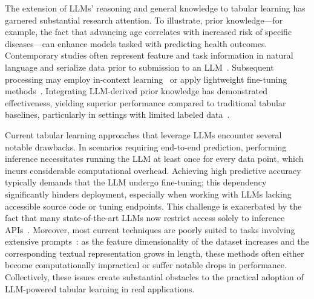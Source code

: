 The extension of LLMs’ reasoning and general knowledge to tabular learning has garnered substantial research attention. To illustrate, prior knowledge—for example, the fact that advancing age correlates with increased risk of specific diseases—can enhance models tasked with predicting health outcomes. Contemporary studies often represent feature and task information in natural language and serialize data prior to submission to an LLM~\cite{dinh2022lift,wang2023anypredict}. Subsequent processing may employ in-context learning~\cite{nam2023semi} or apply lightweight fine-tuning methods~\cite{dinh2022lift,hegselmann2023tabllm}. Integrating LLM-derived prior knowledge has demonstrated effectiveness, yielding superior performance compared to traditional tabular baselines, particularly in settings with limited labeled data~\cite{hegselmann2023tabllm}.

Current tabular learning approaches that leverage LLMs encounter several notable drawbacks. In scenarios requiring end-to-end prediction, performing inference necessitates running the LLM at least once for every data point, which incurs considerable computational overhead. Achieving high predictive accuracy typically demands that the LLM undergo fine-tuning; this dependency significantly hinders deployment, especially when working with LLMs lacking accessible source code or tuning endpoints. This challenge is exacerbated by the fact that many state-of-the-art LLMs now restrict access solely to inference APIs~\cite{anil2023palm,openai2023gpt4}. Moreover, most current techniques are poorly suited to tasks involving extensive prompts~\cite{liu2023lost}: as the feature dimensionality of the dataset increases and the corresponding textual representation grows in length, these methods often either become computationally impractical or suffer notable drops in performance. Collectively, these issues create substantial obstacles to the practical adoption of LLM-powered tabular learning in real applications.

